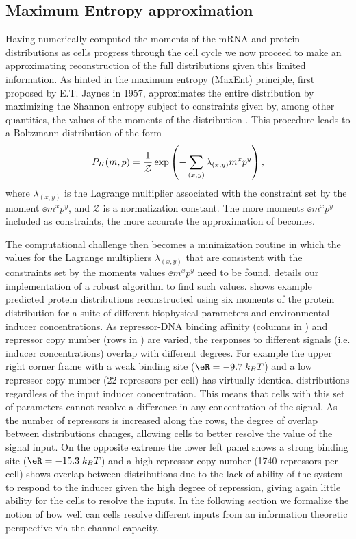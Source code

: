 \subsection*{Maximum Entropy approximation}

Having numerically computed the moments of the mRNA and protein distributions as
cells progress through the cell cycle we now proceed to make an approximating
reconstruction of the full distributions given this limited information. As
hinted in  the maximum entropy (MaxEnt) principle, first
proposed by E.T. Jaynes in 1957, approximates the entire distribution by
maximizing the Shannon entropy subject to constraints given by, among other
quantities, the values of the moments of the distribution \cite{Jaynes1957}.
This procedure leads to a Boltzmann distribution of the form 
\begin{equation}
  P_H(m, p) = {1 \over \mathcal{Z}}
              \exp \left( - \sum_{(x,y)} \lambda_{(x,y)} m^x p^y \right),
  \label{eq_maxEnt_joint}
\end{equation}
where $\lambda_{(x,y)}$ is the Lagrange multiplier associated with the
constraint set by the moment $\ee{m^x p^y}$, and $\mathcal{Z}$ is a
normalization constant. The more moments $\ee{m^x p^y}$ included as constraints,
the more accurate the approximation of  becomes.

The computational challenge then becomes a minimization routine in which the
values for the Lagrange multipliers $\lambda_{(x,y)}$ that are consistent with
the constraints set by the moments values $\ee{m^x p^y}$ need to be found.
 details our implementation of a robust algorithm to find such
values.  shows example predicted protein distributions
reconstructed using six moments of the protein distribution for a suite of
different biophysical parameters and environmental inducer concentrations. As
repressor-DNA binding affinity (columns in ) and repressor
copy number (rows in ) are varied, the responses to different
signals (i.e. inducer concentrations) overlap with different degrees. For
example the upper right corner frame with a weak binding site ($\eR = -9.7 \;
k_BT$) and a low repressor copy number (22 repressors per cell) has virtually
identical distributions regardless of the input inducer concentration. This
means that cells with this set of parameters cannot resolve a difference in any
concentration of the signal. As the number of repressors is increased along the
rows, the degree of overlap between distributions changes, allowing cells to
better resolve the value of the signal input. On the opposite extreme the lower
left panel shows a strong binding site ($\eR = -15.3 \; k_BT$) and a high
repressor copy number (1740 repressors per cell) shows overlap between
distributions due to the lack of ability of the system to respond to the inducer
given the high degree of repression, giving again little ability for the cells
to resolve the inputs. In the following section we formalize the notion of how
well can cells resolve different inputs from an information theoretic
perspective via the channel capacity.

